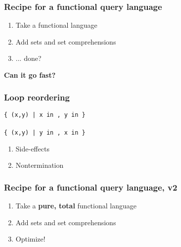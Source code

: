 \documentclass[xcolor=table]{beamer}
\begin{document}

\begin{frame}
  \frametitle{Recipe for a functional query language}
  \Large
  \begin{enumerate}\itemsep 1.5em
  \item Take a functional language
  \item Add sets and set comprehensions
  \item {\color{red} ... done?}
  \end{enumerate}
\end{frame}


\begin{frame}
  \centering
  {\bf\huge Can it go fast?}
\end{frame}

\begin{frame}
  \frametitle{Loop reordering}
  \large
  \centering

  \texttt{\{ (x,y) | x in ,
    y in \}}
  \vspace{0.5em}\\
  {\Large {}}
  \vspace{0.5em}\\
  \texttt{\{ (x,y) | y in ,
    x in \}}

  \pause
  \vspace{3em}\Large
  \begin{minipage}{0.5\textwidth}
    \begin{enumerate}
    \item {\alt<3>{\color{red}}{} Side-effects}
    \item { Nontermination}
    \end{enumerate}
  \end{minipage}
\end{frame}


\begin{frame}
  \frametitle{Recipe for a functional query language, v2}
  \Large
  \begin{enumerate}\itemsep 1.5em
  \item Take a \textbf{pure, total} functional language
  \item Add sets and set comprehensions
  \item {\color{orange} Optimize!}
  \end{enumerate}
\end{frame}
\end{document}
